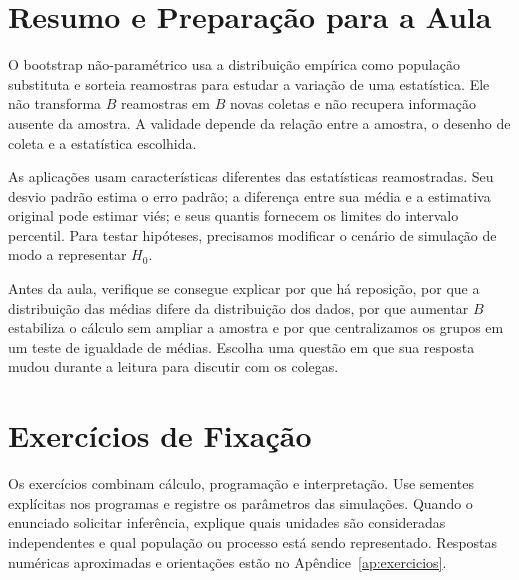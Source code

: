 \documentclass[12pt,a4paper]{article}
\begin{document}
\section{Resumo e Preparação para a Aula}
\label{sec:resumo}
O bootstrap não-paramétrico usa a distribuição empírica como população substituta e sorteia reamostras para estudar a variação de uma estatística. Ele não transforma $B$ reamostras em $B$ novas coletas e não recupera informação ausente da amostra. A validade depende da relação entre a amostra, o desenho de coleta e a estatística escolhida.

As aplicações usam características diferentes das estatísticas reamostradas. Seu desvio padrão estima o erro padrão; a diferença entre sua média e a estimativa original pode estimar viés; e seus quantis fornecem os limites do intervalo percentil. Para testar hipóteses, precisamos modificar o cenário de simulação de modo a representar $H_0$.

Antes da aula, verifique se consegue explicar por que há reposição, por que a distribuição das médias difere da distribuição dos dados, por que aumentar $B$ estabiliza o cálculo sem ampliar a amostra e por que centralizamos os grupos em um teste de igualdade de médias. Escolha uma questão em que sua resposta mudou durante a leitura para discutir com os colegas.

\section{Exercícios de Fixação}
\label{sec:exercicios}
Os exercícios combinam cálculo, programação e interpretação. Use sementes explícitas nos programas e registre os parâmetros das simulações. Quando o enunciado solicitar inferência, explique quais unidades são consideradas independentes e qual população ou processo está sendo representado. Respostas numéricas aproximadas e orientações estão no Apêndice~\ref{ap:exercicios}.
\end{document}
